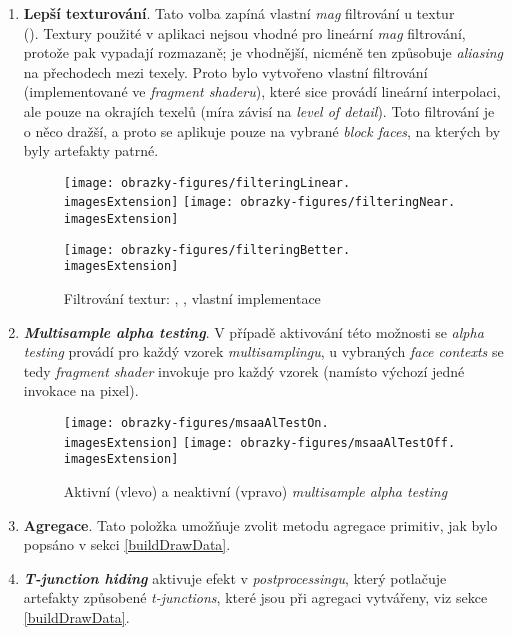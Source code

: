 \begin{enumerate}
	\item \textbf{Lepší texturování}. Tato volba zapíná vlastní \textit{mag} filtrování u textur \\(). Textury použité v aplikaci nejsou vhodné pro lineární \textit{mag} filtrování, protože pak vypadají rozmazaně;  je vhodnější, nicméně ten způsobuje \textit{aliasing} na přechodech mezi texely. Proto bylo vytvořeno vlastní filtrování (implementované ve \textit{fragment shaderu}), které sice provádí lineární interpolaci, ale pouze na okrajích texelů (míra závisí na \textit{level of detail}). Toto filtrování je o něco dražší, a proto se aplikuje pouze na vybrané \textit{block faces}, na kterých by byly artefakty patrné.
	
	\begin{figure}[H]
		\texttt{[image: obrazky-figures/filteringLinear.\\imagesExtension]}
		\hfill
		\texttt{[image: obrazky-figures/filteringNear.\\imagesExtension]}
		
		\vspace{2.2mm}
		
		\texttt{[image: obrazky-figures/filteringBetter.\\imagesExtension]}
		
		\caption{Filtrování textur: , , vlastní implementace}
	\end{figure}
	
	\pagebreak
	\item \textbf{\textit{Multisample alpha testing}}. V případě aktivování této možnosti se \textit{alpha testing} provádí pro každý vzorek \textit{multisamplingu}, u vybraných \textit{face contexts} se tedy \textit{fragment shader} invokuje pro každý vzorek (namísto výchozí jedné invokace na pixel).
	
	\begin{figure}[H]
		\texttt{[image: obrazky-figures/msaaAlTestOn.\\imagesExtension]}
		\hfill
		\texttt{[image: obrazky-figures/msaaAlTestOff.\\imagesExtension]}
		
		\caption{Aktivní (vlevo) a neaktivní (vpravo) \textit{multisample alpha testing}}
	\end{figure}
	
	\item \textbf{Agregace}. Tato položka umožňuje zvolit metodu agregace primitiv, jak bylo popsáno v sekci \ref{buildDrawData}.
	
	\item \textbf{\textit{T-junction hiding}} aktivuje efekt v \textit{postprocessingu}, který potlačuje artefakty způsobené \textit{t-junctions}, které jsou při agregaci vytvářeny, viz sekce \ref{buildDrawData}.
	

\end{enumerate}
